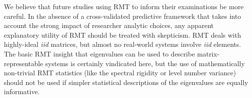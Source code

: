 \documentclass[12pt]{spieman}  %
\begin{document}
\begin{spacing}{2}
We believe that future studies using RMT to inform their examinations be more
careful. In the absence of a cross-validated predictive framework that takes
into account the strong impact of researcher analytic choices, any apparent
explanatory utility of RMT should be treated with skepticism. RMT deals with
highly-ideal \textit{iid} matrices, but almost no real-world systems involve
\textit{iid} elements. The basic RMT insight that eigenvalues can be used to
describe matrix-representable systems is certainly vindicated here, but the use
of mathematically non-trivial RMT statistics (like the spectral rigidity or
level number variance) should not be used if simpler statistical descriptions
of the eigenvalues are equally informative.





\end{spacing}
\end{document}
